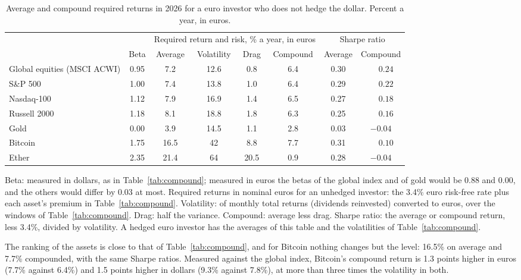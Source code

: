 \documentclass[11pt]{article}
\begin{document}
\begin{table}[ht]\centering\small
\caption{Average and compound required returns in 2026 for a euro investor who does not hedge the dollar. Percent a year, in euros.}
\label{tab:compoundeur}
\setlength{\tabcolsep}{4.5pt}\begin{tabular}{lcccccc@{\hskip 1em}c}
\toprule
 & & \multicolumn{4}{c}{Required return and risk, \% a year, in euros} & \multicolumn{2}{c}{Sharpe ratio} \\
\cmidrule(lr){3-6}\cmidrule(lr){7-8}
 & Beta & Average & Volatility & Drag & Compound & Average & Compound \\
\midrule
Global equities (MSCI ACWI) & 0.95 & 7.2 & 12.6 & 0.8 & 6.4 & 0.30 & $\phantom{-}0.24$ \\
S\&P 500 & 1.00 & 7.4 & 13.8 & 1.0 & 6.4 & 0.29 & $\phantom{-}0.22$ \\
Nasdaq-100 & 1.12 & 7.9 & 16.9 & 1.4 & 6.5 & 0.27 & $\phantom{-}0.18$ \\
Russell 2000 & 1.18 & 8.1 & 18.8 & 1.8 & 6.3 & 0.25 & $\phantom{-}0.16$ \\
Gold & 0.00 & 3.9 & 14.5 & 1.1 & 2.8 & 0.03 & $-0.04$ \\
Bitcoin & 1.75 & 16.5 & 42 & 8.8 & 7.7 & 0.31 & $\phantom{-}0.10$ \\
Ether & 2.35 & 21.4 & 64 & 20.5 & 0.9 & 0.28 & $-0.04$ \\
\bottomrule
\end{tabular}
\par\smallskip\begin{minipage}{0.92\textwidth}\footnotesize Beta: measured in dollars, as in Table~\ref{tab:compound}; measured in euros the betas of the global index and of gold would be 0.88 and 0.00, and the others would differ by 0.03 at most. Required returns in nominal euros for an unhedged investor: the 3.4\% euro risk-free rate plus each asset's premium in Table~\ref{tab:compound}. Volatility: of monthly total returns (dividends reinvested) converted to euros, over the windows of Table~\ref{tab:compound}. Drag: half the variance. Compound: average less drag. Sharpe ratio: the average or compound return, less 3.4\%, divided by volatility. A hedged euro investor has the averages of this table and the volatilities of Table~\ref{tab:compound}.\end{minipage}
\end{table}

The ranking of the assets is close to that of Table~\ref{tab:compound}, and for Bitcoin nothing changes but the level: 16.5\% on average and 7.7\% compounded, with the same Sharpe ratios. Measured against the global index, Bitcoin's compound return is 1.3 points higher in euros (7.7\% against 6.4\%) and 1.5 points higher in dollars (9.3\% against 7.8\%), at more than three times the volatility in both.
\end{document}
